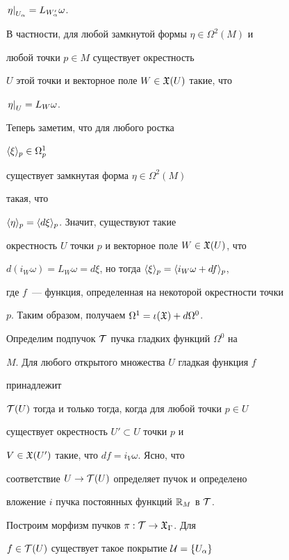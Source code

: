 \begin{pf}
$\left. \eta \right|_{U_\alpha}=L_{W'_\alpha}\omega$.


В частности, для любой замкнутой формы $\eta \in \Omega^2(M)$ и


любой точки $p \in M$ существует окрестность


$U$ этой точки и векторное поле $W \in {\frak X}(U)$ такие, что


$\left. \eta \right|_{U}=L_W \omega$.





Теперь заметим, что для любого ростка


$\langle \xi \rangle_{p} \in \Omega^1_p$


существует замкнутая форма $\eta \in \Omega^2(M)$


такая, что


$\langle \eta \rangle_{p} = \langle d\xi \rangle_{p}$. Значит, существуют такие


окрестность $U$ точки $p$ и векторное поле $W \in {\frak X}(U)$, что


$d(i_W\omega) = L_W\omega


= d\xi$, но тогда $\germ{\xi}{p} = \germ{i_W\omega + df}{p}$,


где $f$~--- функция, определенная на некоторой окрестности точки


$p$. Таким образом, получаем $\Omega^1 = \iota(\gX) +


d\Omega^0$.


\end{pf}





Определим подпучок ${\cal T}$ пучка гладких функций $\Omega^0$ на


$M$. Для любого открытого множества $U$ гладкая функция $f$


принадлежит


${\cal T}(U)$ тогда и только тогда, когда для любой точки $ p \in U$


существует окрестность $ U' \subset U$ точки $ p$ и


$V \in {\frak X}(U')$ такие, что $ df = i_V\omega$. Ясно, что


соответствие $ U \to {\cal T}(U)$ определяет пучок и определено


вложение $i$ пучка постоянных функций ${\Bbb R}_M$ в  ${\cal T}$.





Построим морфизм пучков $\pi :  {\cal T} \to {\frak X}_\Gamma$. Для


$f \in {\cal T}(U)$ существует такое покрытие $ {\cal U} = \{U_\alpha\}$


